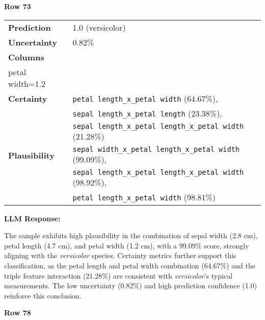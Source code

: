 \documentclass[acmlarge]{acmart}
\begin{document}
\begin{adjustwidth}{0.5cm}{0.5cm}

\textbf{Row 73}
\vspace{0.3em}

\begin{tabularx}{\textwidth}{@{}lX@{}}
\toprule
\textbf{Prediction} & 1.0 (versicolor) \\
\textbf{Uncertainty} & 0.82\% \\
\textbf{Columns} & \begin{tabular}[t]{@{}l@{}}
sepal length=6.1, sepal width=2.8, petal length=4.7,\\ petal width=1.2
\end{tabular} \\
\textbf{Certainty} & \texttt{petal length\_x\_petal width} (64.67\%),\\
& \texttt{sepal length\_x\_petal length} (23.38\%),\\
& \texttt{sepal length\_x\_petal length\_x\_petal width} (21.28\%) \\
\textbf{Plausibility} & \texttt{sepal width\_x\_petal length\_x\_petal width} (99.09\%),\\
& \texttt{sepal length\_x\_petal length\_x\_petal width} (98.92\%),\\
& \texttt{petal length\_x\_petal width} (98.81\%) \\
\bottomrule
\end{tabularx}

\vspace{0.5em}
\noindent\textbf{LLM Response:}

The sample exhibits high plausibility in the combination of sepal width (2.8 cm), petal length (4.7 cm), and petal width (1.2 cm), with a 99.09\% score, strongly aligning with the \textit{versicolor} species. Certainty metrics further support this classification, as the petal length and petal width combination (64.67\%) and the triple feature interaction (21.28\%) are consistent with \textit{versicolor}'s typical measurements. The low uncertainty (0.82\%) and high prediction confidence (1.0) reinforce this conclusion.

\vspace{1em}
\textbf{Row 78}
\vspace{0.3em}


\end{adjustwidth}
\end{document}
